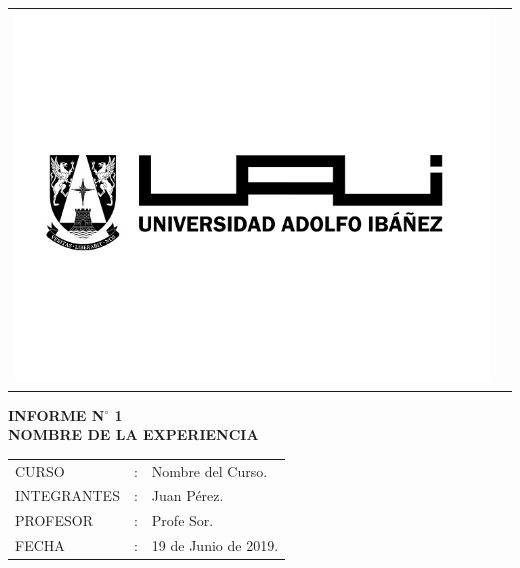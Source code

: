 \begin{titlepage}
    \begin{flushleft}
        \begin{tabular}{ll} %
          \multirow{4}{2cm}{\includegraphics[height=0.2\textheight]{img/logo-uai-b.jpg}}
        \end{tabular}
    \end{flushleft}
    
    \vspace*{\fill}%
    \begin{center}
    \textbf{INFORME N$\bm{^{\circ}}$ 1}\\ %
    \textbf{NOMBRE DE LA EXPERIENCIA} 
    \end{center}
    \vspace*{\fill}%
    
    \begin{flushright}
       \begin{tabular}{lll}
       CURSO       &:& Nombre del Curso.\\
       INTEGRANTES &:& Juan Pérez.\\
       PROFESOR    &:& Profe Sor.\\
       FECHA       &:& 19 de Junio de 2019.\\
       \end{tabular}
    \end{flushright}
    \end{titlepage}
    